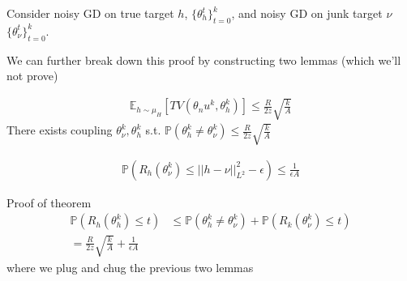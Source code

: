Consider noisy GD on true target $h$, $\{\theta_h^t\}_{t=0}^k$, and noisy GD on junk target $\nu$ $\{\theta_\nu^t\}_{t=0}^k$.

We can further break down this proof by constructing two lemmas (which we'll not prove)
\begin{lemma}
	\begin{align}
		\mathbb E_{h \sim \mu_H}[TV(\theta_nu^k, \theta_h^k)] \leq \frac{R}{2z} \sqrt{\frac{k}{A}}
 	\end{align}
 	There exists coupling $\theta_\nu^k, \theta_h^k$ s.t. $\mathbb P(\theta_h^k \neq \theta_\nu^k) \leq \frac{R}{2z} \sqrt{\frac{k}{A}}$
\end{lemma}
\begin{lemma}
	\begin{align}
		\mathbb P(R_h(\theta_\nu^k) \leq ||h - \nu||_{L^2}^2 - \epsilon) \leq \frac{1}{\epsilon A}
	\end{align}
\end{lemma}
Proof of theorem
\begin{align}
	\mathbb P(R_h(\theta_h^k)\leq t) & \leq \mathbb P(\theta_h^k \neq \theta_\nu^k) + \mathbb P(R_k(\theta^k_\nu) \leq t)\\
	= \frac{R}{2z} \sqrt{\frac{k}{A}} + \frac{1}{\epsilon A}
\end{align}
where we plug and chug the previous two lemmas























